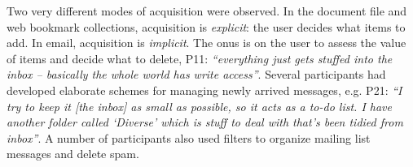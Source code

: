 Two very different modes of acquisition were observed. In the document file and web bookmark collections, acquisition is \textit{explicit}: the user decides what items to add. In email, acquisition is \textit{implicit}.  The onus is on the user to assess the value of items and decide what to delete, P11: \textit{``everything just gets stuffed into the inbox -- basically the whole world has write access''}.   %
Several participants had developed elaborate schemes for managing newly arrived messages, e.g. P21: \textit{``I try to keep it [the inbox] as small as possible, so it acts as a to-do list. I have another folder called `Diverse' which is stuff to deal with that's been tidied from inbox''}.  A number of participants also used filters to organize mailing list messages and delete spam.


